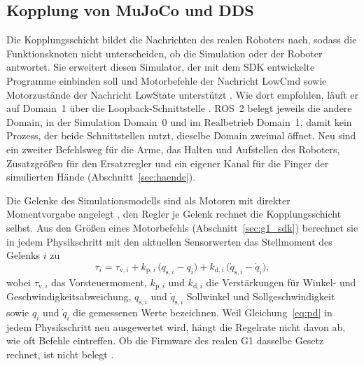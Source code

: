 \subsection{Kopplung von MuJoCo und DDS}
\label{sec:bridge}
Die Kopplungsschicht bildet die Nachrichten des realen Roboters nach, sodass die Funktionsknoten nicht unterscheiden, ob die Simulation oder der Roboter antwortet.
Sie erweitert diesen Simulator, der mit dem SDK entwickelte Programme einbinden soll \cite{UnitreeMujoco} und Motorbefehle der Nachricht LowCmd sowie Motorzustände der Nachricht LowState unterstützt \cite{UnitreeMujoco}.
Wie dort empfohlen, läuft er auf Domain~1 über die Loopback-Schnittstelle \cite{UnitreeMujoco}.
ROS~2 belegt jeweils die andere Domain, in der Simulation Domain~0 und im Realbetrieb Domain~1, damit kein Prozess, der beide Schnittstellen nutzt, dieselbe Domain zweimal öffnet.
Neu sind ein zweiter Befehlsweg für die Arme, das Halten und Aufstellen des Roboters, Zusatzgrößen für den Ersatzregler und ein eigener Kanal für die Finger der simulierten Hände (Abschnitt~\ref{sec:haende}).

Die Gelenke des Simulationsmodells sind als Motoren mit direkter Momentvorgabe angelegt \cite{MujocoDoku2026}, den Regler je Gelenk rechnet die Kopplungsschicht selbst.
Aus den Größen eines Motorbefehls (Abschnitt~\ref{sec:g1_sdk}) berechnet sie in jedem Physikschritt mit den aktuellen Sensorwerten das Stellmoment des Gelenks $i$ zu
\begin{equation}
  \tau_i = \tau_{\mathrm{v},i} + k_{\mathrm{p},i}\,\bigl(q_{\mathrm{s},i} - q_i\bigr) + k_{\mathrm{d},i}\,\bigl(\dot q_{\mathrm{s},i} - \dot q_i\bigr),
  \label{eq:pd}
\end{equation}
%
wobei $\tau_{\mathrm{v},i}$ das Vorsteuermoment, $k_{\mathrm{p},i}$ und $k_{\mathrm{d},i}$ die Verstärkungen für Winkel- und Geschwindigkeitsabweichung, $q_{\mathrm{s},i}$ und $\dot q_{\mathrm{s},i}$ Sollwinkel und Sollgeschwindigkeit sowie $q_i$ und $\dot q_i$ die gemessenen Werte bezeichnen.
Weil Gleichung~\ref{eq:pd} in jedem Physikschritt neu ausgewertet wird, hängt die Regelrate nicht davon ab, wie oft Befehle eintreffen.
Ob die Firmware des realen G1 dasselbe Gesetz rechnet, ist nicht belegt .


